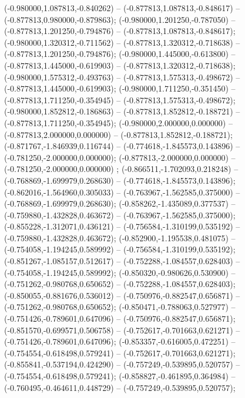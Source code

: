  (-0.980000,1.087813,-0.840262) -- (-0.877813,1.087813,-0.848617) -- (-0.877813,0.980000,-0.879863);
 (-0.980000,1.201250,-0.787050) -- (-0.877813,1.201250,-0.794876) -- (-0.877813,1.087813,-0.848617);
 (-0.980000,1.320312,-0.711562) -- (-0.877813,1.320312,-0.718638) -- (-0.877813,1.201250,-0.794876);
 (-0.980000,1.445000,-0.613800) -- (-0.877813,1.445000,-0.619903) -- (-0.877813,1.320312,-0.718638);
 (-0.980000,1.575312,-0.493763) -- (-0.877813,1.575313,-0.498672) -- (-0.877813,1.445000,-0.619903);
 (-0.980000,1.711250,-0.351450) -- (-0.877813,1.711250,-0.354945) -- (-0.877813,1.575313,-0.498672);
 (-0.980000,1.852812,-0.186863) -- (-0.877813,1.852812,-0.188721) -- (-0.877813,1.711250,-0.354945);
 (-0.980000,2.000000,0.000000) -- (-0.877813,2.000000,0.000000) -- (-0.877813,1.852812,-0.188721);
 (-0.871767,-1.846939,0.116744) -- (-0.774618,-1.845573,0.143896) -- (-0.781250,-2.000000,0.000000);
 (-0.877813,-2.000000,0.000000) -- (-0.781250,-2.000000,0.000000) ;
 (-0.866511,-1.702093,0.218248) -- (-0.768869,-1.699979,0.268630) -- (-0.774618,-1.845573,0.143896);
 (-0.862016,-1.564960,0.305033) -- (-0.763967,-1.562585,0.375000) -- (-0.768869,-1.699979,0.268630);
 (-0.858262,-1.435089,0.377537) -- (-0.759880,-1.432828,0.463672) -- (-0.763967,-1.562585,0.375000);
 (-0.855228,-1.312071,0.436121) -- (-0.756584,-1.310199,0.535192) -- (-0.759880,-1.432828,0.463672);
 (-0.852900,-1.195538,0.481075) -- (-0.754058,-1.194245,0.589992) -- (-0.756584,-1.310199,0.535192);
 (-0.851267,-1.085157,0.512617) -- (-0.752288,-1.084557,0.628403) -- (-0.754058,-1.194245,0.589992);
 (-0.850320,-0.980626,0.530900) -- (-0.751262,-0.980768,0.650652) -- (-0.752288,-1.084557,0.628403);
 (-0.850055,-0.881676,0.536012) -- (-0.750976,-0.882547,0.656871) -- (-0.751262,-0.980768,0.650652);
 (-0.850471,-0.788063,0.527977) -- (-0.751426,-0.789601,0.647096) -- (-0.750976,-0.882547,0.656871);
 (-0.851570,-0.699571,0.506758) -- (-0.752617,-0.701663,0.621271) -- (-0.751426,-0.789601,0.647096);
 (-0.853357,-0.616005,0.472251) -- (-0.754554,-0.618498,0.579241) -- (-0.752617,-0.701663,0.621271);
 (-0.855841,-0.537194,0.424290) -- (-0.757249,-0.539895,0.520757) -- (-0.754554,-0.618498,0.579241);
 (-0.858827,-0.461895,0.364984) -- (-0.760495,-0.464611,0.448729) -- (-0.757249,-0.539895,0.520757);
